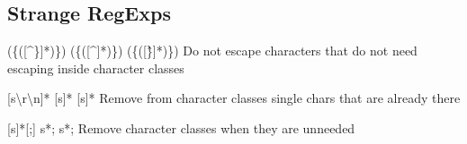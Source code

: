 \documentclass[14pt]{beamer}
\begin{document}
\subsection{Strange RegExps}
  {(\doubleslash{}\{([\^\doubleslash{}\}]*)\doubleslash{}\})}
  {(\doubleslash{}\{([\^]*)\doubleslash{}\})}
  {(\doubleslash{}\{([\^\}]*)\doubleslash{}\})}
  {Do not escape characters that do not need escaping inside character classes}

  {[\doubleslash{}s\textbackslash{}r\textbackslash{}n]*}
  {[\doubleslash{}s]*}
  {[\doubleslash{}s]*}
  {Remove from character classes single chars that are already there}

  {[\doubleslash s]*[;]}
  {\colored{[}\doubleslash{}s\colored{]}*\colored{[};\colored{]}}
  {\doubleslash{}s*;}
  {Remove character classes when they are unneeded}

\end{document}
